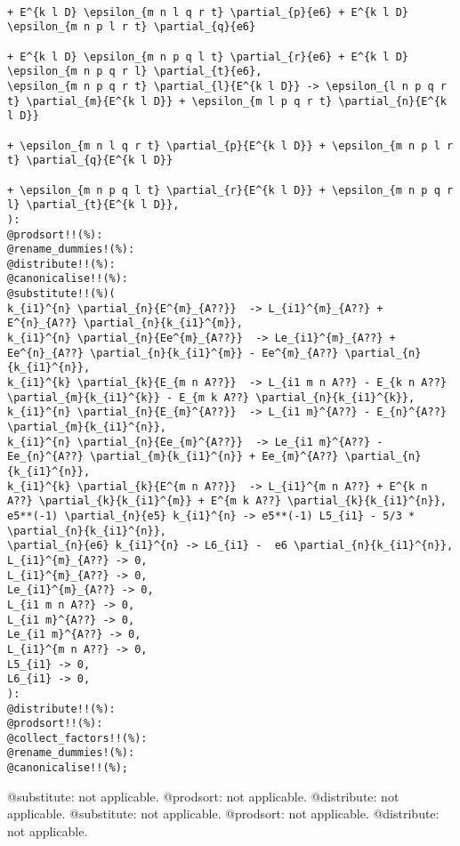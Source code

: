 \documentclass[11pt]{article}
\begin{document}
{\begin{verbatim}
                                                                                + E^{k l D} \epsilon_{m n l q r t} \partial_{p}{e6} + E^{k l D} \epsilon_{m n p l r t} \partial_{q}{e6}
                                                                                + E^{k l D} \epsilon_{m n p q l t} \partial_{r}{e6} + E^{k l D} \epsilon_{m n p q r l} \partial_{t}{e6},
\epsilon_{m n p q r t} \partial_{l}{E^{k l D}} -> \epsilon_{l n p q r t} \partial_{m}{E^{k l D}} + \epsilon_{m l p q r t} \partial_{n}{E^{k l D}}
                                                                           + \epsilon_{m n l q r t} \partial_{p}{E^{k l D}} + \epsilon_{m n p l r t} \partial_{q}{E^{k l D}}
                                                                           + \epsilon_{m n p q l t} \partial_{r}{E^{k l D}} + \epsilon_{m n p q r l} \partial_{t}{E^{k l D}},
):
@prodsort!!(%):
@rename_dummies!(%):
@distribute!!(%):
@canonicalise!!(%):
@substitute!!(%)(
k_{i1}^{n} \partial_{n}{E^{m}_{A??}}  -> L_{i1}^{m}_{A??} + E^{n}_{A??} \partial_{n}{k_{i1}^{m}},
k_{i1}^{n} \partial_{n}{Ee^{m}_{A??}}  -> Le_{i1}^{m}_{A??} + Ee^{n}_{A??} \partial_{n}{k_{i1}^{m}} - Ee^{m}_{A??} \partial_{n}{k_{i1}^{n}},
k_{i1}^{k} \partial_{k}{E_{m n A??}}  -> L_{i1 m n A??} - E_{k n A??} \partial_{m}{k_{i1}^{k}} - E_{m k A??} \partial_{n}{k_{i1}^{k}},
k_{i1}^{n} \partial_{n}{E_{m}^{A??}}  -> L_{i1 m}^{A??} - E_{n}^{A??} \partial_{m}{k_{i1}^{n}},
k_{i1}^{n} \partial_{n}{Ee_{m}^{A??}}  -> Le_{i1 m}^{A??} - Ee_{n}^{A??} \partial_{m}{k_{i1}^{n}} + Ee_{m}^{A??} \partial_{n}{k_{i1}^{n}},
k_{i1}^{k} \partial_{k}{E^{m n A??}}  -> L_{i1}^{m n A??} + E^{k n A??} \partial_{k}{k_{i1}^{m}} + E^{m k A??} \partial_{k}{k_{i1}^{n}},
e5**(-1) \partial_{n}{e5} k_{i1}^{n} -> e5**(-1) L5_{i1} - 5/3 * \partial_{n}{k_{i1}^{n}},
\partial_{n}{e6} k_{i1}^{n} -> L6_{i1} -  e6 \partial_{n}{k_{i1}^{n}},
L_{i1}^{m}_{A??} -> 0,
L_{i1}^{m}_{A??} -> 0,
Le_{i1}^{m}_{A??} -> 0,
L_{i1 m n A??} -> 0,
L_{i1 m}^{A??} -> 0,
Le_{i1 m}^{A??} -> 0,
L_{i1}^{m n A??} -> 0,
L5_{i1} -> 0,
L6_{i1} -> 0,
):
@distribute!!(%):
@prodsort!!(%):
@collect_factors!!(%):
@rename_dummies!(%):
@canonicalise!!(%);
\end{verbatim}}
@substitute: not applicable.
@prodsort: not applicable.
@distribute: not applicable.
@substitute: not applicable.
@prodsort: not applicable.
@distribute: not applicable.
\end{document}
